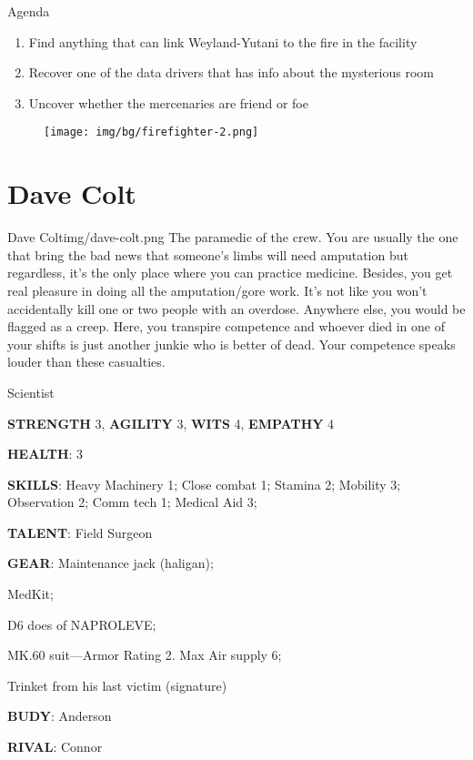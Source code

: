 \begin{rpg-commentbox}{Agenda}
    \begin{enumerate}[label=\textbf{Act \arabic*}, leftmargin=1cm]
        \item Find anything that can link Weyland-Yutani to the fire in the facility
        \item Recover one of the data drivers that has info about the mysterious room
        \item Uncover whether the mercenaries are friend or foe
    \end{enumerate}
\end{rpg-commentbox}


\newsect

\begin{figure}
    \centering
    \texttt{[image: img/bg/firefighter-2.png]}
    \label{fig:refinery}
\end{figure}


\clearpage

\section{Dave Colt}

\begin{rpg-pcbox}{Dave Colt}{img/dave-colt.png}
    The paramedic of the crew. You are usually the one that bring the bad news that someone's limbs will need amputation but regardless, it's the only place where you can practice medicine. Besides, you get real pleasure in doing all the amputation/gore work. It's not like you won't accidentally kill one or two people with an overdose.
    Anywhere else, you would be flagged as a creep. Here, you transpire competence and whoever died in one of your shifts is just another junkie who is better of dead. Your competence speaks louder than these casualties.
\end{rpg-pcbox}

\begin{rpg-commentbox}{}
    Scientist

    \textbf{STRENGTH} 3, \textbf{AGILITY} 3, \textbf{WITS} 4, \textbf{EMPATHY} 4

    \textbf{HEALTH}: 3

    \textbf{SKILLS}: Heavy Machinery 1; Close combat 1; Stamina 2; Mobility 3; Observation 2; Comm tech 1; Medical Aid 3;
    
    \textbf{TALENT}: Field Surgeon
    
    \textbf{GEAR}: Maintenance jack (haligan);
    
    MedKit;

    D6 does of NAPROLEVE;
    
    MK.60 suit---Armor Rating 2. Max Air supply 6;  
    
    Trinket from his last victim (signature)

    \textbf{BUDY}: Anderson
    
    \textbf{RIVAL}: Connor
\end{rpg-commentbox}


